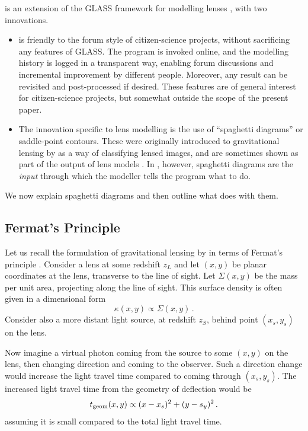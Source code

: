 \spl is an extension of the GLASS framework for modelling lenses
\citep{2014arXiv1401.7990C}, with two innovations.
\begin{itemize}
\item \spl is friendly to the forum style of citizen-science projects,
  without sacrificing any features of GLASS.  The program is invoked
  online, and the modelling history is logged in a transparent way,
  enabling forum discussions and incremental improvement by different
  people.  Moreover, any result can be revisited and post-processed if
  desired.  These features are of general interest for citizen-science
  projects, but somewhat outside the scope of the present paper.
\item The innovation specific to lens modelling is the use of
  ``spaghetti diagrams'' or saddle-point contours.  These were
  originally introduced to gravitational lensing by
  \cite{1986ApJ...310..568B} as a way of classifying lensed images,
  and are sometimes shown as part of the output of lens models
  \citep[for
    example][]{2001ApJ...557..594R,2003ApJ...590...39K,Lubini2012}.
  In \spl, however, spaghetti diagrams are the {\em input\/} through
  which the modeller tells the program what to do.
\end{itemize}

We now explain spaghetti diagrams and then outline what \spl does with
them.

\subsection{Fermat's Principle} \label{sec:Fermat}

Let us recall the formulation of gravitational lensing by
\cite{1986ApJ...310..568B} in terms of Fermat's principle .  Consider
a lens at some redshift $z_L$ and let $(x,y)$ be planar coordinates at
the lens, transverse to the line of sight.  Let $\Sigma(x,y)$ be the
mass per unit area, projecting along the line of sight.  This surface
density is often given in a dimensional form
\begin{equation} \label{eq:kappa}
\kappa(x,y) \propto \Sigma(x,y) \,.
\end{equation}
Consider also a more distant light source, at redshift $z_S$, behind
point $(x_s,y_s)$ on the lens.

Now imagine a virtual photon coming from the source to some $(x,y)$ on
the lens, then changing direction and coming to the observer.  Such a
direction change would increase the light travel time compared to
coming through $(x_s,y_s)$.  The increased light travel time from the
geometry of deflection would be
\begin{equation} \label{eq:tgeom}
t_{\rm geom}(x,y) \propto (x-x_s)^2 + (y-s_y)^2 \,.
\end{equation}
assuming it is small compared to the total light travel time.

